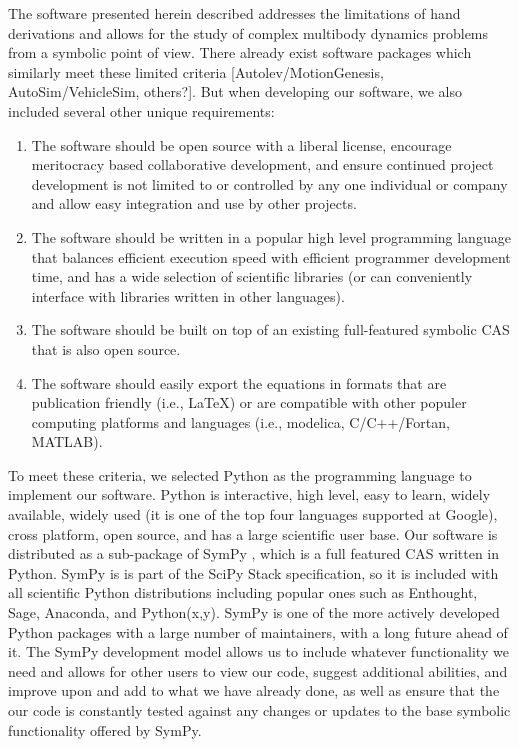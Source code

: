 \documentclass[twocolumn,10pt]{asme2e}
\begin{document}
The software presented herein described addresses the limitations of hand
derivations and allows for the study of complex multibody dynamics problems
from a symbolic point of view. There already exist software packages which
similarly meet these limited criteria [Autolev/MotionGenesis,
AutoSim/VehicleSim, others?]. But when developing our software, we also
included several other unique requirements:
\begin{enumerate}
  \item The software should be open source with a liberal license, encourage
  meritocracy based collaborative development, and ensure continued project
  development is not limited to or controlled by any one individual or company
  and allow easy integration and use by other projects.

  \item The software should be written in a popular high level programming
  language that balances efficient execution speed with efficient programmer
  development time, and has a wide selection of scientific libraries (or can
  conveniently interface with libraries written in other languages).

  \item The software should be built on top of an existing full-featured
  symbolic CAS that is also open source.

  \item The software should easily export the equations in formats that are
  publication friendly (i.e., \LaTeX) or are compatible with other populer
  computing platforms and languages (i.e., modelica, C/C++/Fortan, MATLAB).
\end{enumerate}
To meet these criteria, we selected Python as the programming language to
implement our software. Python is interactive, high level, easy to learn,
widely available, widely used (it is one of the top four languages supported at
Google), cross platform, open source, and has a large scientific user base.
Our software is distributed as a sub-package of SymPy \cite{SymPy2012}, which
is a full featured CAS written in
Python. SymPy is is part of the SciPy Stack \cite{SciPy} specification,
so it is included with all scientific Python distributions including popular
ones such as Enthought, Sage, Anaconda, and Python(x,y). SymPy is one of the
more actively developed Python packages with a large number of maintainers,
with a long future ahead of it. The SymPy development model allows us to
include whatever functionality we need and allows for other users to view our
code, suggest additional abilities, and improve upon and add to what we have
already done, as well as ensure that the our code is constantly tested against
any changes or updates to the base symbolic functionality offered by SymPy.
\end{document}
